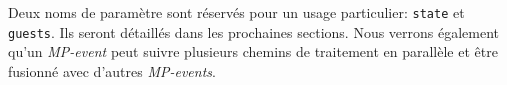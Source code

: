 \noindent Deux noms de paramètre sont réservés pour un usage particulier: \texttt{state} et \texttt{guests}. Ils seront détaillés dans les prochaines sections. Nous verrons également qu'un \textit{MP-event} peut suivre plusieurs chemins de traitement en parallèle et être fusionné avec d'autres \textit{MP-events}. 


